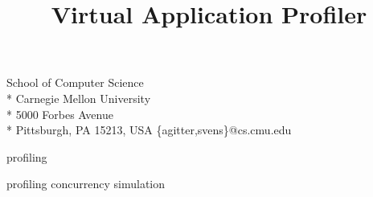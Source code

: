 \documentclass[natbib,10pt]{sigplanconf}
\begin{document}
\conferenceinfo{ }
\CopyrightYear{ }
\copyrightdata{ }



\title{Virtual Application Profiler}



           {School of Computer Science \\* Carnegie Mellon University  \\* 5000 Forbes Avenue \\* Pittsburgh, PA 15213, USA}
           {\{agitter,svens\}@cs.cmu.edu}


\maketitle




\terms
profiling

\keywords
profiling concurrency simulation






















\end{document}
